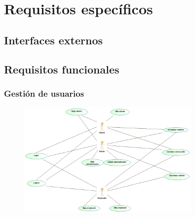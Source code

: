 \section{Requisitos específicos}
\subsection{Interfaces externos}
\subsection{Requisitos funcionales}
\subsubsection{Gestión de usuarios}%
\begin{figure}[H]
    \centering
    \includegraphics[width = 0.8\textwidth]{Use_Cases/Gestion_Usuarios.png}
\end{figure}
